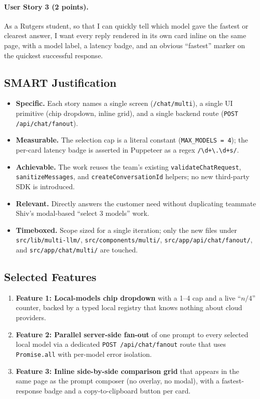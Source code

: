\documentclass[11pt]{article}
\begin{document}
\paragraph{User Story 3 (2 points).}
As a Rutgers student, so that I can quickly tell which model gave the
fastest or clearest answer, I want every reply rendered in its own card
inline on the same page, with a model label, a latency badge, and an obvious
``fastest'' marker on the quickest successful response.

\subsection{SMART Justification}

\begin{itemize}[leftmargin=*]
  \item \textbf{Specific.} Each story names a single screen
    (\texttt{/chat/multi}), a single UI primitive (chip dropdown,
    inline grid), and a single backend route (\texttt{POST
    /api/chat/fanout}).
  \item \textbf{Measurable.} The selection cap is a literal constant
    (\texttt{MAX\_MODELS = 4}); the per-card latency badge is asserted in
    Puppeteer as a regex \texttt{/\textbackslash d+\textbackslash.\textbackslash d+s/}.
  \item \textbf{Achievable.} The work reuses the team's existing
    \texttt{validateChatRequest}, \texttt{sanitizeMessages}, and
    \texttt{createConversationId} helpers; no new third-party SDK is
    introduced.
  \item \textbf{Relevant.} Directly answers the customer need without
    duplicating teammate Shiv's modal-based ``select 3 models'' work.
  \item \textbf{Timeboxed.} Scope sized for a single iteration; only the
    new files under \texttt{src/lib/multi-llm/}, \texttt{src/components/multi/},
    \texttt{src/app/api/chat/fanout/}, and \texttt{src/app/chat/multi/}
    are touched.
\end{itemize}

\subsection{Selected Features}

\begin{enumerate}[leftmargin=*]
  \item \textbf{Feature 1: Local-models chip dropdown} with a 1--4 cap and
    a live ``\(n/4\)'' counter, backed by a typed local registry that
    knows nothing about cloud providers.
  \item \textbf{Feature 2: Parallel server-side fan-out} of one prompt to
    every selected local model via a dedicated
    \texttt{POST /api/chat/fanout} route that uses \texttt{Promise.all}
    with per-model error isolation.
  \item \textbf{Feature 3: Inline side-by-side comparison grid} that
    appears in the same page as the prompt composer (no overlay, no
    modal), with a fastest-response badge and a copy-to-clipboard
    button per card.
\end{enumerate}
\end{document}
